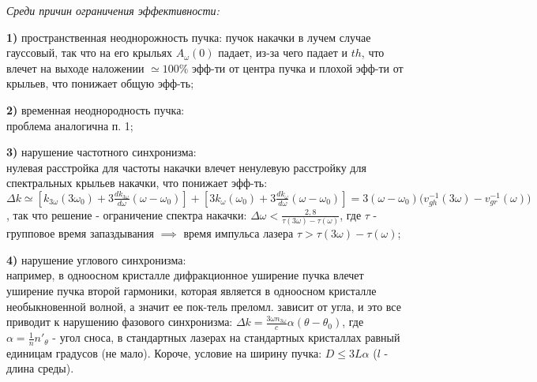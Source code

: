 \textit{Среди причин ограничения эффективности:}
    \par \textbf{1)} пространственная неоднорожность пучка:
    пучок накачки в лучем случае гауссовый, так что на его крыльях $A_{\omega}(0)$ падает, из-за чего падает и $th$, что влечет на выходе наложении $\simeq 100\%$ эфф-ти от центра пучка и плохой эфф-ти от крыльев, что понижает общую эфф-ть; \\
    \par \textbf{2)} временная неоднородность пучка: \\
    проблема аналогична п. 1; \\
    \par \textbf{3)} нарушение частотного синхронизма: \\
    нулевая расстройка для частоты накачки влечет ненулевую расстройку для спектральных крыльев накачки, что понижает эфф-ть: $\Delta k \simeq [k_{3\omega}(3\omega_{0})+3\frac{dk_{3\omega}}{d\omega}(\omega-\omega_{0})]+[3k_{\omega}(\omega_{0})+3\frac{dk_{\omega}}{d\omega}(\omega-\omega_{0})] = 3(\omega-\omega_{0}) \big( v_{gh}^{-1}(3\omega) - v_{gr}^{-1}(\omega) \big)$, так что решение - ограничение спектра накачки: $\Delta \omega < \frac{2,8}{\tau (3\omega) - \tau (\omega)}$, где $\tau$ - групповое время запаздывания $\implies$ время импульса лазера $\tau > \tau(3\omega)-\tau(\omega)$; \\ 
    \par \textbf{4)} нарушение углового синхронизма: \\
    например, в одноосном кристалле дифракционное уширение пучка влечет уширение пучка второй гармоники, которая является в одноосном кристалле необыкновенной волной, а значит ее пок-тель преломл. зависит от угла, и это все приводит к нарушению фазового синхронизма: $\Delta k = \frac{3\omega n_{3\omega}}{c}\alpha (\theta - \theta_{0})$, где $\alpha = \frac{1}{n}n'_{\theta}$ - угол сноса, в стандартных лазерах на стандартных кристаллах равный единицам градусов (не мало). Короче, условие на ширину пучка: $D \leq 3L \alpha$ ($l$ - длина среды).

